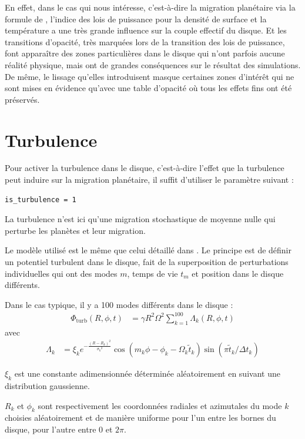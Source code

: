 En effet, dans le cas qui nous intéresse, c'est-à-dire la migration planétaire via la formule de \citep{paardekooper2011torque},
l'indice des lois de puissance pour la densité de surface et la température a une très grande influence sur la couple effectif
du disque. Et les transitions d'opacité, très marquées lors de la transition des lois de puissance, font apparaître des zones
particulières dans le disque qui n'ont parfois aucune réalité physique, mais ont de grandes conséquences sur le résultat des
simulations. De même, le lissage qu'elles introduisent masque certaines zones d'intérêt qui ne sont mises en évidence qu'avec
une table d'opacité où tous les effets fins ont été préservés.

\section{Turbulence}
Pour activer la turbulence dans le disque, c'est-à-dire l'effet que la turbulence peut induire sur la migration planétaire, il suffit d'utiliser le paramètre suivant : 
\begin{verbatim}
is_turbulence = 1
\end{verbatim}

La turbulence n'est ici qu'une migration stochastique de moyenne nulle qui perturbe les planètes et leur migration. 

Le modèle utilisé est le même que celui détaillé dans \cite{ogihara2007accretion}. Le principe est de définir un potentiel
turbulent dans le disque, fait de la superposition de perturbations individuelles qui ont des modes $m$, temps de vie $t_m$ et
position dans le disque différents. 

Dans le cas typique, il y a 100 modes différents dans le disque : 
\begin{align}
\Phi_\text{turb}(R,\phi,t) &= \gamma R^2 \Omega^2 \sum_{k=1}^{100} \Lambda_k(R,\phi,t)
\end{align}
avec 
\begin{align}
\Lambda_k &= \xi_k e^{-\frac{(R-R_k)^2}{{\sigma_k}^2}} \cos\left(m_k \phi -\phi_k - \Omega_k\tilde{t}_k\right) \sin\left(\pi \tilde{t}_k/\Delta t_k\right)
\end{align}

$\xi_k$ est une constante adimensionnée déterminée aléatoirement en suivant une distribution gaussienne.

$R_k$ et $\phi_k$ sont respectivement les coordonnées radiales et azimutales du mode $k$ choisies aléatoirement et de manière uniforme pour l'un entre les bornes du disque, pour l'autre entre $0$ et $2\pi$. 

